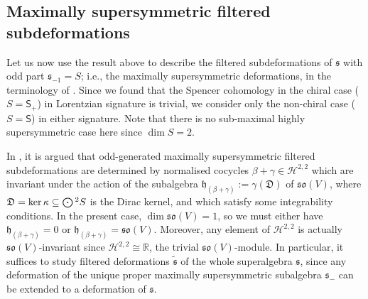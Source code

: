 \documentclass[pdftex]{sigma}
\numberwithin{equation}{section}
\newcommand{\fh}{\mathfrak{h}}
\newcommand{\fs}{\mathfrak{s}}
\newcommand{\fso}{\mathfrak{so}}
\newcommand{\fD}{\mathfrak{D}}
\newcommand{\RR}{\mathbb{R}}
\newcommand{\cH}{\mathcal{H}}
\newcommand{\ssS}{\mathsf{S}}
\newcommand{\fstilde}{\widetilde{\fs}}
\newcommand{\Odot}{\mathchoice{{\textstyle\bigodot}}{\bigodot}{\bigodot}{\bigodot}}
\newcommand{\1}{\mathbbm{1}}
\begin{document}
\subsection{Maximally supersymmetric filtered subdeformations}
\label{sec:2d-max-susy-subdef}

Let us now use the result above to describe the filtered subdeformations of $\fs$ with odd part ${\fs_{-1}=S}$; i.e., the maximally supersymmetric deformations, in the terminology of \cite[Definition~4.10]{Beckett2024_2}. Since we found that the Spencer cohomology in the chiral case ($S=\ssS_+$) in Lorentzian signature is trivial, we consider only the non-chiral case ($S=\ssS$) in either signature. Note that there is no sub-maximal highly supersymmetric case here since $\dim S=2$.

In \cite[Section~4.5.5]{Beckett2024_2}, it is argued that odd-generated maximally supersymmetric filtered subdeformations are determined by normalised cocycles $\beta+\gamma\in\cH^{2,2}$ which are invariant under the action of the subalgebra $\fh_{(\beta+\gamma)}:=\gamma(\fD)$ of $\fso(V)$, where $\fD=\ker\kappa\subseteq\Odot^2 S$ is the Dirac kernel, and which satisfy some integrability conditions. In the present case, $\dim\fso(V)=1$, so we must either have $\fh_{(\beta+\gamma)}=0$ or $\fh_{(\beta+\gamma)}=\fso(V)$. Moreover, any element of $\cH^{2,2}$ is actually $\fso(V)$-invariant since $\cH^{2,2}\cong\RR$, the trivial $\fso(V)$-module. In particular, it suffices to study filtered deformations $\fstilde$ of the whole superalgebra $\fs$, since any deformation of the unique proper maximally supersymmetric subalgebra $\fs_-$ can be extended to a deformation of $\fs$.
\end{document}
